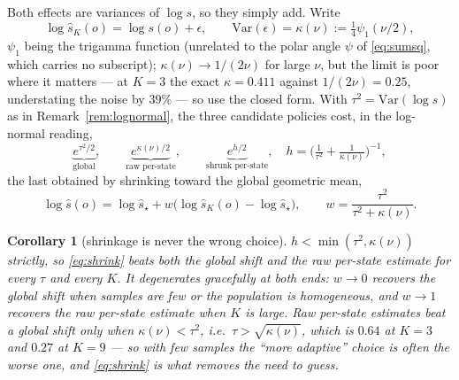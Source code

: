 \documentclass[11pt]{article}
\newtheorem{corollary}[proposition]{Corollary}
\theoremstyle{definition}
\newcommand{\Var}{\mathrm{Var}}
\begin{document}
Both effects are variances of $\log s$, so they simply add. Write
\begin{equation}
  \log\hat s_K(o)=\log s(o)+\epsilon,
  \qquad
  \Var(\epsilon)=\kappa(\nu):=\tfrac14\psi_1(\nu/2),
  \label{eq:kappa}
\end{equation}
$\psi_1$ being the trigamma function (unrelated to the polar angle $\psi$ of
\eqref{eq:sumsq}, which carries no subscript); $\kappa(\nu)\to1/(2\nu)$ for large
$\nu$, but the limit is poor where it matters --- at $K=3$ the exact
$\kappa=0.411$ against $1/(2\nu)=0.25$, understating the noise by $39\%$ --- so
use the closed form. With $\tau^2=\Var(\log s)$ as in
Remark~\ref{rem:lognormal}, the three candidate policies cost, in the log-normal
reading,
\begin{equation}
  \underbrace{e^{\tau^2/2}}_{\text{global}},
  \qquad
  \underbrace{e^{\kappa(\nu)/2}}_{\text{raw per-state}},
  \qquad
  \underbrace{e^{h/2}}_{\text{shrunk per-state}},
  \quad
  h=\Big(\tfrac{1}{\tau^2}+\tfrac{1}{\kappa(\nu)}\Big)^{-1},
  \label{eq:threecosts}
\end{equation}
the last obtained by shrinking toward the global geometric mean,
\begin{equation}
  \boxed{\;
  \log\hat s(o)=\log\hat s_\star+w\big(\log\hat s_K(o)-\log\hat s_\star\big),
  \qquad
  w=\frac{\tau^2}{\tau^2+\kappa(\nu)} .
  \;}
  \label{eq:shrink}
\end{equation}

\begin{corollary}[shrinkage is never the wrong choice]
\label{cor:shrink}
$h<\min(\tau^2,\kappa(\nu))$ strictly, so \eqref{eq:shrink} beats both the global
shift and the raw per-state estimate for every $\tau$ and every $K$. It
degenerates gracefully at both ends: $w\to0$ recovers the global shift when
samples are few or the population is homogeneous, and $w\to1$ recovers the raw
per-state estimate when $K$ is large. Raw per-state estimates beat a global shift
only when $\kappa(\nu)<\tau^2$, i.e.\ $\tau>\sqrt{\kappa(\nu)}$, which is
$0.64$ at $K=3$ and $0.27$ at $K=9$ --- so with few samples the ``more
adaptive'' choice is often the worse one, and \eqref{eq:shrink} is what removes
the need to guess.
\end{corollary}
\end{document}
